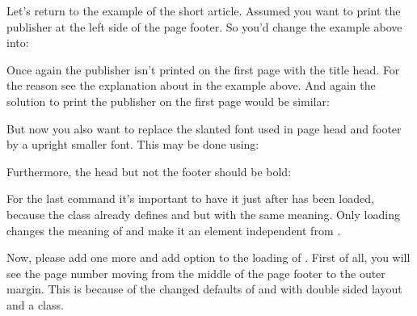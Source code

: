 \begin{Example}
  Let's return to the example of the short article. Assumed you want to print
  the publisher at the left side of the page footer. So you'd change the
  example above into:
  Once again the publisher isn't printed on the first page with the title
  head. For the reason see the explanation about  in the example
  above. And again the solution to print the publisher on the first page would
  be similar:
\begin{lstcode}
\end{lstcode}
  But now you also want to replace the slanted font used in page head and
  footer by a upright smaller font. This may be done using:
\begin{lstcode}
\end{lstcode}
  Furthermore, the head but not the footer should be bold:
\begin{lstcode}
\end{lstcode}
  For the last command it's important to have it just after
   has been loaded, because
  the \KOMAScript{} class already defines  and
   but with the same meaning. Only loading
   changes the meaning of  and
  make it an element independent from .

  Now, please add one more  and add option  to
  the loading of . First of all, you will see the page number
  moving from the middle of the page footer to the outer margin. This is
  because of the changed defaults of  and
   with double sided layout and a \KOMAScript{}
  class.


\end{Example}
